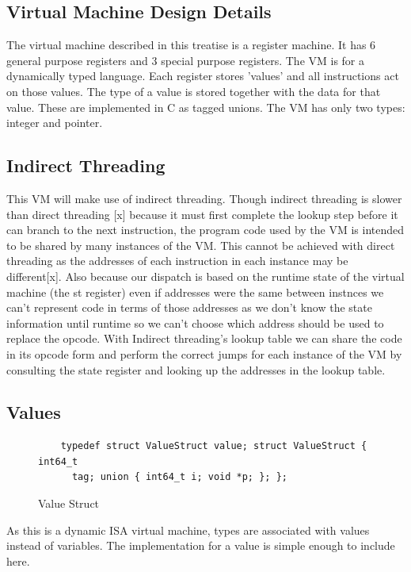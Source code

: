 \documentclass[english,a4paper]{article}
\begin{document}
\subsection{Virtual Machine Design Details}

The virtual machine described in this treatise is a register
machine. It has 6 general purpose registers and 3 special purpose
registers. The VM is for a dynamically typed language. Each register
stores 'values' and all instructions act on those values. The type of
a value is stored together with the data for that value. These are
implemented in C as tagged unions. The VM has only two types: integer
and pointer.

\subsection{Indirect Threading}

This VM will make use of indirect threading. Though indirect threading
is slower than direct threading {[}x{]} because it must first complete
the lookup step before it can branch to the next instruction, the
program code used by the VM is intended to be shared by many instances
of the VM. This cannot be achieved with direct threading as the
addresses of each instruction in each instance may be
different{[}x{]}. Also because our dispatch is based on the runtime
state of the virtual machine (the st register) even if addresses were
the same between instnces we can't represent code in terms of those
addresses as we don't know the state information until runtime so we
can't choose which address should be used to replace the opcode. With
Indirect threading's lookup table we can share the code in its opcode
form and perform the correct jumps for each instance of the VM by
consulting the state register and looking up the addresses in the
lookup table.

\subsection{Values}

\begin{figure}
  \begin{lstlisting}
    typedef struct ValueStruct value; struct ValueStruct { int64_t
      tag; union { int64_t i; void *p; }; };
  \end{lstlisting}
  \label{fig:struct}
  \caption{Value Struct}
\end{figure}

As this is a dynamic ISA virtual machine, types are associated with
values instead of variables\cite{RobertoIerusalimschy}. The
implementation for a value is simple enough to include here.
\end{document}
